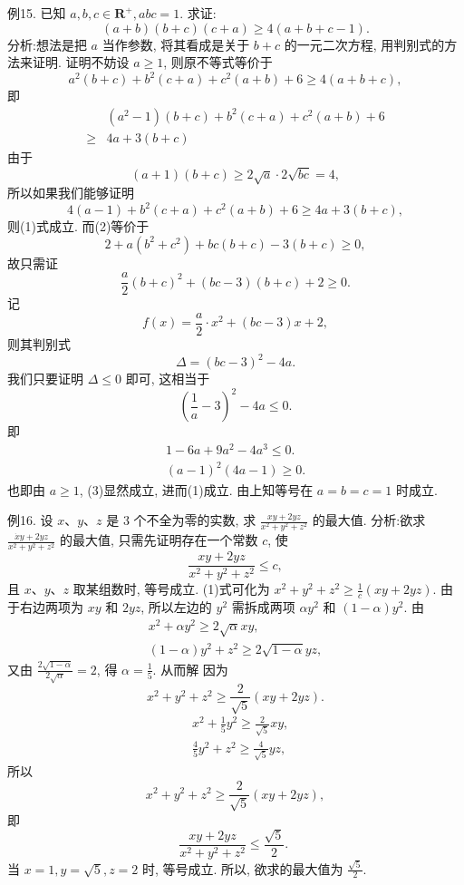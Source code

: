 例15. 已知 $a, b, c \in \mathbf{R}^{+}, a b c=1$. 求证:
$$
(a+b)(b+c)(c+a) \geqslant 4(a+b+c-1) .
$$
分析:想法是把 $a$ 当作参数, 将其看成是关于 $b+c$ 的一元二次方程, 用判别式的方法来证明.
证明不妨设 $a \geqslant 1$, 则原不等式等价于
$$
a^2(b+c)+b^2(c+a)+c^2(a+b)+6 \geqslant 4(a+b+c), \label{(1)}
$$
即
$$
\begin{aligned}
& \left(a^2-1\right)(b+c)+b^2(c+a)+c^2(a+b)+6 \\
\geqslant & 4 a+3(b+c)
\end{aligned}
$$
由于
$$
(a+1)(b+c) \geqslant 2 \sqrt{a} \cdot 2 \sqrt{b c}=4,
$$
所以如果我们能够证明
$$
4(a-1)+b^2(c+a)+c^2(a+b)+6 \geqslant 4 a+3(b+c), \label{(2)}
$$
则(1)式成立.
而(2)等价于
$$
2+a\left(b^2+c^2\right)+b c(b+c)-3(b+c) \geqslant 0,
$$
故只需证
$$
\frac{a}{2}(b+c)^2+(b c-3)(b+c)+2 \geqslant 0 .
$$
记
$$
f(x)=\frac{a}{2} \cdot x^2+(b c-3) x+2,
$$
则其判别式
$$
\Delta=(b c-3)^2-4 a .
$$
我们只要证明 $\Delta \leqslant 0$ 即可, 这相当于
$$
\left(\frac{1}{a}-3\right)^2-4 a \leqslant 0 .
$$
即
$$
\begin{gathered}
1-6 a+9 a^2-4 a^3 \leqslant 0 . \\
(a-1)^2(4 a-1) \geqslant 0 . \label{(3)}
\end{gathered}
$$
也即由 $a \geqslant 1$, (3)显然成立, 进而(1)成立.
由上知等号在 $a=b=c=1$ 时成立.



例16. 设 $x 、 y 、 z$ 是 3 个不全为零的实数, 求 $\frac{x y+2 y z}{x^2+y^2+z^2}$ 的最大值.
分析:欲求 $\frac{\dot{x} y+2 y z}{x^2+y^2+z^2}$ 的最大值, 只需先证明存在一个常数 $c$, 使
$$
\frac{x y+2 y z}{x^2+y^2+z^2} \leqslant c, \label{(1)}
$$
且 $x 、 y 、 z$ 取某组数时, 等号成立.
(1)式可化为 $x^2+y^2+z^2 \geqslant \frac{1}{c}(x y+2 y z)$. 由于右边两项为 $x y$ 和 $2 y z$, 所以左边的 $y^2$ 需拆成两项 $\alpha y^2$ 和 $(1-\alpha) y^2$. 由
$$
\begin{gathered}
x^2+\alpha y^2 \geqslant 2 \sqrt{\alpha} x y, \\
(1-\alpha) y^2+z^2 \geqslant 2 \sqrt{1-\alpha} y z,
\end{gathered}
$$
又由 $\frac{2 \sqrt{1-\alpha}}{2 \sqrt{\alpha}}=2$, 得 $\alpha=\frac{1}{5}$.
从而解 因为
$$
x^2+y^2+z^2 \geqslant \frac{2}{\sqrt{5}}(x y+2 y z) .
$$
$$
\begin{aligned}
& x^2+\frac{1}{5} y^2 \geqslant \frac{2}{\sqrt{5}} x y, \\
& \frac{4}{5} y^2+z^2 \geqslant \frac{4}{\sqrt{5}} y z,
\end{aligned}
$$
所以
$$
x^2+y^2+z^2 \geqslant \frac{2}{\sqrt{5}}(x y+2 y z),
$$
即
$$
\frac{x y+2 y z}{x^2+y^2+z^2} \leqslant \frac{\sqrt{5}}{2} \text {. }
$$
当 $x=1, y=\sqrt{5}, z=2$ 时, 等号成立.
所以, 欲求的最大值为 $\frac{\sqrt{5}}{2}$.



